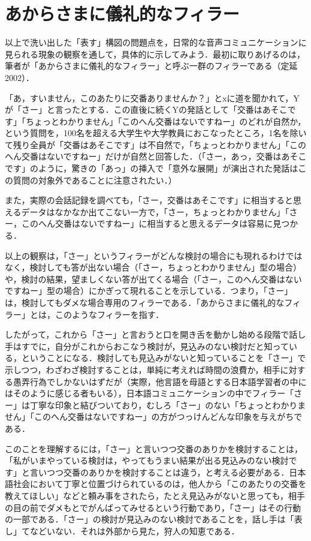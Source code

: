 \documentclass[japanese]{jnlp_1.3b}
\begin{document}
\section{あからさまに儀礼的なフィラー}

以上で洗い出した「表す」構図の問題点を，日常的な音声コミュニケーションに見られる現象の観察を通して，具体的に示してみよう．最初に取りあげるのは，筆者が「あからさまに儀礼的なフィラー」と呼ぶ一群のフィラーである（定延 2002）．

「あ，すいません，このあたりに交番ありませんか？」とxに道を聞かれて，Yが「さー」と言ったとする．この直後に続くYの発話として「交番はあそこです」「ちょっとわかりません」「このへん交番はないですねー」のどれが自然か，という質問を，100名を超える大学生や大学教員におこなったところ，1名を除いて残り全員が「交番はあそこです」は不自然で，「ちょっとわかりません」「このへん交番はないですねー」だけが自然と回答した．（「さー，あっ，交番はあそこです」のように，驚きの「あっ」の挿入で「意外な展開」が演出された発話はこの質問の対象外であることに注意されたい．）

また，実際の会話記録を調べても，「さー，交番はあそこです」に相当すると思えるデータはなかなか出てこない一方で，「さー，ちょっとわかりません」「さー，このへん交番はないですねー」に相当すると思えるデータは容易に見つかる．

以上の観察は，「さー」というフィラーがどんな検討の場合にも現れるわけではなく，検討しても答が出ない場合（「さー，ちょっとわかりません」型の場合）や，検討の結果，望ましくない答が出てくる場合（「さー，このへん交番はないですねー」型の場合）にかぎって現れることを示している．つまり，「さー」は，検討してもダメな場合専用のフィラーである．「あからさまに儀礼的なフィラー」とは，このようなフィラーを指す．

したがって，これから「さー」と言おうと口を開き舌を動かし始める段階で話し手はすでに，自分がこれからおこなう検討が，見込みのない検討だと知っている，ということになる．検討しても見込みがないと知っていることを「さー」で示しつつ，わざわざ検討することは，単純に考えれば時間の浪費か，相手に対する愚弄行為でしかないはずだが（実際，他言語を母語とする日本語学習者の中にはそのように感じる者もいる），日本語コミュニケーションの中でフィラー「さー」は丁寧な印象と結びついており，むしろ「さー」のない「ちょっとわかりません」「このへん交番はないですねー」の方がつっけんどんな印象を与えがちである．

このことを理解するには，「さー」と言いつつ交番のありかを検討することは，「私がいまやっている検討は，やってもうまい結果が出る見込みのない検討です」と言いつつ交番のありかを検討することは違う，と考える必要がある．日本語社会において丁寧と位置づけられているのは，他人から「このあたりの交番を教えてほしい」などと頼み事をされたら，たとえ見込みがないと思っても，相手の目の前でダメもとでがんばってみせるという行動であり，「さー」はその行動の一部である．「さー」の検討が見込みのない検討であることを，話し手は「表し」てなどいない．それは外部から見た，狩人の知恵である．
\end{document}
